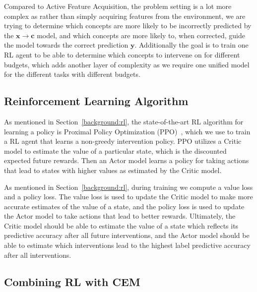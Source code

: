 Compared to Active Feature Acquisition, the problem setting is a lot more complex as
rather than simply acquiring features from the environment, we are trying to determine
which concepts are more likely to be incorrectly predicted by the $\mathbf{x} \to \mathbf{c}$ model, 
and
which concepts are more likely to, when corrected, guide the model towards the correct prediction
 $\mathbf{y}$.
Additionally the goal is to train one RL agent to be able to determine which concepts
to intervene on for different budgets, which adds another layer of complexity as we require
one unified model for the different tasks with different budgets.

\subsection{Reinforcement Learning Algorithm}

As mentioned in Section~\ref{background:rl}, the state-of-the-art RL algorithm 
for learning
a policy is Proximal Policy Optimization (PPO)~\cite{ppo}, which we use
to train a RL agent that learns a non-greedy intervention policy.
PPO utilizes a Critic model to estimate
the value of a particular state, which is the discounted expected future rewards. Then
an Actor model learns a policy
for taking actions that lead to states with higher values as estimated by the
Critic model.

As mentioned in Section~\ref{background:rl},
during training we compute a value loss and a policy loss. The value loss is used to update 
the Critic model to make more accurate estimates of the value of a state, and the policy loss is used to update the Actor model to take actions that lead to better rewards.
Ultimately, the Critic model
should be able to estimate the value of a state which reflects its predictive accuracy after all 
future interventions,
and the Actor model should be able to estimate which
interventions lead to the highest label predictive accuracy 
after all interventions.

\subsection{Combining RL with CEM}

